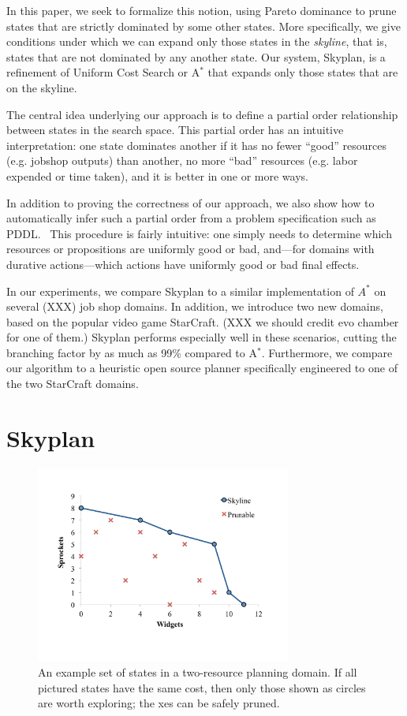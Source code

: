 \documentclass[letterpaper]{article}
\theoremstyle{plain} \newtheorem{theorem}{Theorem} \newtheorem{proposition}{Proposition} \newtheorem{lemma}{Lemma}
\theoremstyle{definition} \newtheorem{definition}{Definition} \newtheorem{conjecture}{Conjecture} \newtheorem*{example}{Example}
\theoremstyle{remark} \newtheorem*{remark}{Remark} \newtheorem*{note}{Note} \newtheorem{case}{Case}
\begin{document}
In this paper, we seek to formalize this notion, using Pareto
dominance to prune states that are strictly dominated by some other
states. More specifically, we give conditions under which we can
expand only those states in the \textit{skyline}, that is, states
that are not dominated by any another state. Our system, Skyplan,
is a refinement of Uniform Cost Search or A$^*$ that expands only
those states that are on the skyline.

The central idea underlying our approach is to define a partial
order relationship between states in the search space. This partial
order has an intuitive interpretation: one state dominates another
if it has no fewer ``good'' resources (e.g. jobshop outputs) than
another, no more ``bad'' resources (e.g. labor expended or time
taken), and it is better in one or more ways. 

In addition to proving the correctness of our approach, we also
show how to automatically infer such a partial order from a problem
specification such as PDDL.~\cite{ghallab1998pddl,fox2003pddl2}
This procedure is fairly intuitive: one simply needs to determine
which resources or propositions are uniformly good or bad, and---for 
domains with durative actions---which actions have uniformly
good or bad final effects.

In our experiments, we compare Skyplan to a similar implementation
of $A^*$ on several (XXX) job shop domains. In addition, we introduce
two new domains, based on the popular video game StarCraft. (XXX
we should credit evo chamber for one of them.) Skyplan performs
especially well in these scenarios, cutting the branching factor
by as much as 99\% compared to A$^*$.  Furthermore, we compare our
algorithm to a heuristic open source planner specifically engineered
to one of the two StarCraft domains.

\section{Skyplan}

\begin{figure}
	\begin{center}
	\includegraphics[width=3.3in]{skyline2d.pdf}
\end{center}
  \caption{An example set of states in a two-resource planning domain. If
all pictured states have the same cost, then only those shown as circles are
worth exploring; the xes can be safely pruned.}
\end{figure}
\end{document}
